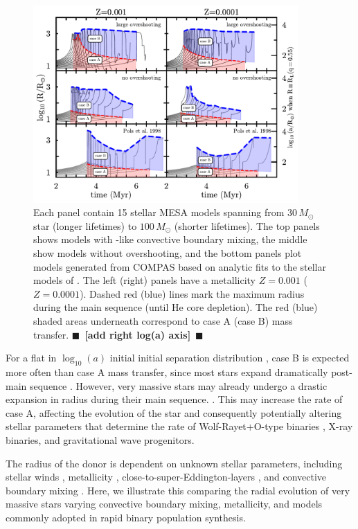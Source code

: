 \documentclass[twocolumn]{aastex63}
\newcommand{\todo}[1]{{\large $\blacksquare$~\textbf{\color{red}[#1]}}~$\blacksquare$}
\begin{document}
\begin{figure}[htbp]
  \centering
  \includegraphics[width=0.9\textwidth]{radii}
  \caption{Each panel contain 15 stellar \textsc{MESA} models spanning
    from $30 \, M_{\odot}$ star (longer lifetimes) to
    $100 \, M_{\odot}$ (shorter lifetimes). The top panels shows
    models with \cite{brott:11}-like convective boundary mixing, the
    middle show models without overshooting, and the bottom panels
    plot models generated from \textsc{COMPAS} based on analytic fits
    to the stellar models of \cite{pols:98}. The left (right) panels
    have a metallicity $Z=0.001$ ($Z=0.0001$). Dashed red (blue) lines
    mark the maximum radius during the main sequence (until He core
    depletion). The red (blue) shaded areas underneath correspond to
    case A (case B) mass transfer. \todo{add right log(a) axis}}
  \label{fig:radii}
\end{figure}


For a flat in $\log_{10}(a)$ initial initial separation distribution
\citep{opik:24}, case B is expected more often than case A mass
transfer, since most stars expand dramatically post-main sequence
\citep{vandenheuvel:69}. However, very massive stars may already
undergo a drastic expansion in radius during their main sequence.
\citep[e.g.,][]{sanyal:15, jiang:15, sabhahit:24}. This may increase
the rate of case A, affecting the evolution of the star and
consequently potentially altering stellar parameters that determine
the rate of Wolf-Rayet+O-type binaries \citep[e.g.,][]{nuijten:24},
X-ray binaries, and gravitational wave progenitors.

The radius of the
donor is dependent on unknown stellar parameters, including stellar
winds \citep{renzo:17, josiek:24}, metallicity \citep{xin:22},
close-to-super-Eddington-layers \citep[e.g.,][]{joss:73, paxton:13,
  jiang:15, agrawal:22, jermyn:23}, and convective boundary mixing
\citep{anders:23, johnston:24}. Here, we illustrate this comparing the
radial evolution of very massive stars varying convective boundary
mixing, metallicity, and models commonly adopted in rapid binary
population synthesis.
\end{document}

